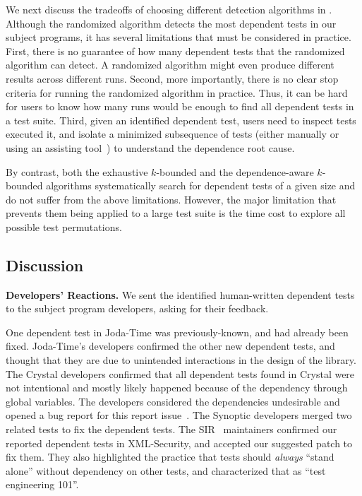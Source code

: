 We next discuss the tradeoffs of choosing different detection
algorithms in \ourtool. Although the randomized algorithm
detects the most dependent tests in our subject programs,
it has several limitations that must be considered
in practice. First, there is no guarantee of how many
dependent tests that the randomized algorithm can detect. A randomized
algorithm might even produce different results across different runs.
Second, more importantly, there is no clear stop criteria
for running the randomized algorithm in practice.
Thus, it can be hard for users
to know how many runs would be enough to find all dependent tests in a test suite.
Third, given an identified dependent test, users
need to inspect tests executed it, and isolate a minimized
subsequence of tests (either
manually or using an assisting tool~\cite{Zeller:2002}) to understand the dependence root cause.

By contrast, both the exhaustive $k$-bounded and the depend\-ence-aware
$k$-bounded algorithms systematically search for dependent
tests of a given size and do not suffer from the above limitations.
However, the major limitation that prevents them being applied to a
large test suite is the time cost to
explore all possible test permutations.





\subsection{Discussion}
\label{sec:expdiscussion}


\noindent \textbf{Developers' Reactions.}
We sent the identified human-written dependent tests to the
subject program developers, asking for their feedback.

One dependent test in Joda-Time was previously-known,
and had already been fixed. Joda-Time's
developers confirmed the other new dependent
tests, and thought that they are due to unintended interactions
in the design of the library.
%
The Crystal developers confirmed that all dependent tests
found in Crystal were not intentional and mostly likely
happened because of the dependency
through global variables. The developers considered the
dependencies undesirable and opened a bug report for
this report issue~\cite{crystalbugreport}.
%
The Synoptic developers merged two related tests to fix
the dependent tests.
%
The SIR~\cite{sir} maintainers confirmed our reported dependent
tests in XML-Security, and accepted our
suggested patch to fix them. They also highlighted the practice
that tests should \textit{always} ``stand alone''
without dependency on other tests, and characterized that as
``test engineering 101''. 

